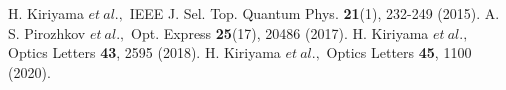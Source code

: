\documentclass[a4paper,11pt,titlepage]{jsarticle}
\begin{document}
\begin{thebibliography}{99}
H. Kiriyama $et\ al.,$ IEEE J. Sel. Top. Quantum Phys. {\bf 21}(1), 232-249 (2015). 
A. S. Pirozhkov $et\ al.,$ Opt. Express {\bf 25}(17), 20486 (2017). 
H. Kiriyama $et\ al.,$ Optics Letters {\bf 43}, 2595 (2018).
H. Kiriyama $et\ al.,$ Optics Letters {\bf 45}, 1100 (2020).
\end{thebibliography}
\newpage
\end{document}
